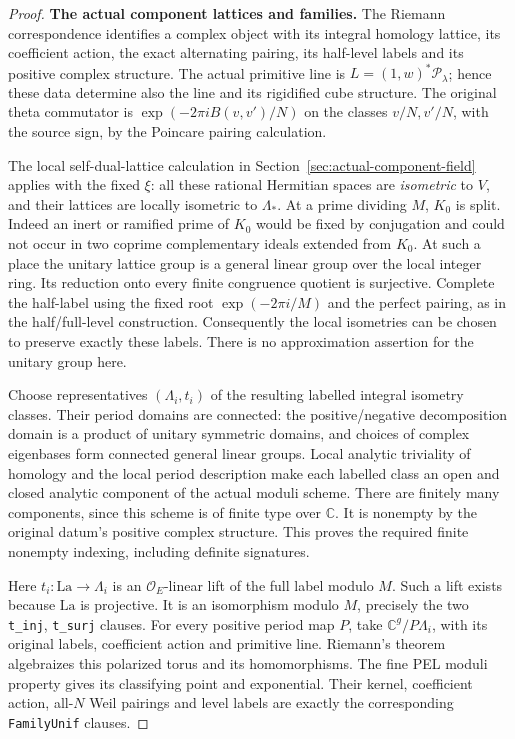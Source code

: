 \begin{proof}
\par\medskip\noindent\textbf{The actual component lattices and families.}
The Riemann correspondence identifies a complex object with its
integral homology lattice, its coefficient action, the exact
alternating pairing, its half-level labels and its positive complex
structure\cite{member-milne-av}.  The actual primitive line is
$L=(1,w)^*\mathcal P_\lambda$; hence these data determine also the
line and its rigidified cube structure.  The original theta
commutator is
$\exp(-2\pi i B(v,v')/N)$ on the classes $v/N,v'/N$,
with the source sign, by the Poincare pairing
calculation\cite{member-lan}.

The local self-dual-lattice calculation in
Section~\ref{sec:actual-component-field} applies with the fixed $\xi$:
all these rational Hermitian spaces are \emph{isometric} to $V$,
and their lattices are locally isometric to $\Lambda_*$.  At a
prime dividing $M$, $K_0$ is split.  Indeed an inert or ramified
prime of $K_0$ would be fixed by conjugation and could not occur
in two coprime complementary ideals extended from $K_0$.
At such a place the unitary lattice group is a general linear
group over the local integer ring.  Its reduction onto every
finite congruence quotient is surjective.  Complete the half-label
using the fixed root $\exp(-2\pi i/M)$ and the perfect pairing,
as in the half/full-level construction.  Consequently the local
isometries can be chosen to preserve exactly these labels.
There is no approximation assertion for the unitary group here.

Choose representatives $(\Lambda_i,t_i)$ of the resulting labelled
integral isometry classes.  Their period domains are connected:
the positive/negative decomposition domain is a product of
unitary symmetric domains, and choices of complex eigenbases
form connected general linear groups.  Local analytic triviality
of homology and the local period description make each labelled
class an open and closed analytic component of the actual moduli
scheme.  There are finitely many components, since this scheme
is of finite type over $\mathbb C$.  It is nonempty by the original
datum's positive complex structure.  This proves the required
finite nonempty indexing, including definite signatures.

Here $t_i:\mathrm{La}\to\Lambda_i$ is an
$\mathcal O_E$-linear lift of the full label modulo $M$.
Such a lift exists because $\mathrm{La}$ is projective.  It is an
isomorphism modulo $M$, precisely the two \texttt{t\_inj},
\texttt{t\_surj} clauses.  For every positive period map $P$,
take $\mathbb C^g/P\Lambda_i$, with its original labels, coefficient
action and primitive line.  Riemann's theorem algebraizes this
polarized torus and its homomorphisms.  The fine PEL moduli property
gives its classifying point and exponential.  Their kernel, coefficient
action, all-$N$ Weil pairings and level labels are exactly the
corresponding \texttt{FamilyUnif} clauses.


\end{proof}
